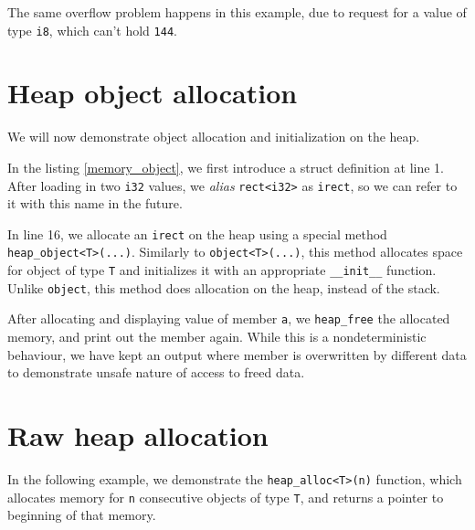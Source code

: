 \documentclass[times, utf8, diplomski]{fer}
\theoremstyle{definition}
\newcommand{\textcode}[3]{
    
}
\begin{document}
\textcode{\resdir/programs/fib_compile_time.out}{fib_ct_out}{Compile-time Fibonacci - output}

The same overflow problem happens in this example, due to request for a value of type \texttt{i8},
which can't hold \texttt{144}.


\section{Heap object allocation}

We will now demonstrate object allocation and initialization on the heap. 

\textcode{\resdir/programs/memory_object.agt}{memory_object}{Heap object allocation}
\textcode{\resdir/programs/memory_object.in}{memory_object_in}{Heap object allocation - input}
\textcode{\resdir/programs/memory_object.out}{memory_object_out}{Heap object allocation - output}

In the listing \ref{memory_object}, we first introduce a struct definition at line 1.
After loading in two \texttt{i32} values, we \textit{alias} \texttt{rect<i32>} as \texttt{irect},
so we can refer to it with this name in the future.

In line 16, we allocate an \texttt{irect} on the heap using a special method \texttt{heap\_object<T>(...)}.
Similarly to \texttt{object<T>(...)}, this method allocates space for object of type \texttt{T} and
initializes it with an appropriate \texttt{\_\_init\_\_} function. Unlike \texttt{object}, this method
does allocation on the heap, instead of the stack.

After allocating and displaying value of member \texttt{a}, 
we \texttt{heap\_free} the allocated memory, and
print out the member again. While this is a nondeterministic behaviour,
we have kept an output where member is overwritten by different data to demonstrate
unsafe nature of access to freed data.


\section{Raw heap allocation}

In the following example, we demonstrate the \texttt{heap\_alloc<T>(n)} function,
which allocates memory for \texttt{n} consecutive objects of type \texttt{T},
and returns a pointer to beginning of that memory.

\textcode{\resdir/programs/memory_alloc.agt}{memory_alloc}{Raw heap allocation}
\textcode{\resdir/programs/memory_alloc.out}{memory_alloc}{Raw heap allocation - output}
\end{document}
